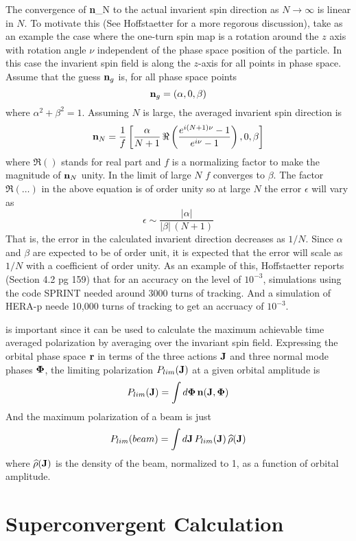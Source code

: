 \documentclass[11pt,openany]{report}
\newcommand{\Bf}[1]{{\bf #1}}
\newcommand{\bfn}{{\Bf n}}
\newcommand{\bfr}{{\Bf r}}
\newcommand{\bfJ}{{\Bf J}}
\newcommand{\bfPhi}{{\Bf \Phi}}
\newcommand{\Plim}{P_{lim}}
\newcommand{\Begineq}{\begin{equation}}
\newcommand{\Endeq}{\end{equation}}
\begin{document}
The convergence of \bfn_N to the actual invarient spin direction as $N \rightarrow \infty$ is linear
in $N$. To motivate this (See Hoffstaetter for a more regorous discussion), take as an example the
case where the one-turn spin map is a rotation around the $z$ axis with rotation angle $\nu$
independent of the phase space position of the particle. In this case the invarient spin field is
along the $z$-axis for all points in phase space. Assume that the guess $\bfn_g$ is, for all phase
space points
\Begineq
  \bfn_g = (\alpha, 0, \beta)
\Endeq
where $\alpha^2 + \beta^2 = 1$. Assuming $N$ is large, the averaged invarient spin direction is
\Begineq
  \bfn_N = \frac{1}{f} \left[ \frac{\alpha}{N+1} \, 
    \Re \left( \frac{e^{i (N+1) \nu} - 1}{e^{i \nu} - 1} \right),
    0, \beta \right]
\Endeq
where $\Re()$ stands for real part and $f$ is a normalizing factor to make the magnitude of $\bfn_N$
unity. In the limit of large $N$ $f$ converges to $\beta$. The factor $\Re(\ldots)$ in the above
equation is of order unity so at large $N$ the error $\epsilon$ will vary as
\Begineq
  \epsilon \sim \frac{|\alpha|}{|\beta| \, (N+1)}
\Endeq
That is, the error in the calculated invarient direction decreases as $1/N$. Since $\alpha$ and
$\beta$ are expected to be of order unit, it is expected that the error will scale as $1/N$ with a
coefficient of order unity. As an example of this, Hoffstaetter reports (Section 4.2 pg 159) that
for an accuracy on the level of $10^{-3}$, simulations using the code SPRINT needed around 3000
turns of tracking. And a simulation of HERA-p neede 10,000 turns of tracking to get an accruacy of
$10^{-3}$.


is important since it can be used to
calculate the maximum achievable time averaged polarization by averaging over the invariant spin
field. Expressing the orbital phase space $\bfr$ in terms of the three actions $\bfJ$ and three normal
mode phases $\bfPhi$, the limiting polarization $\Plim(\bfJ)$ at a given orbital amplitude is
\Begineq
  \Plim(\bfJ) = \int d\bfPhi \, \bfn(\bfJ, \bfPhi)
\Endeq
And the maximum polarization of a beam is just
\Begineq
   \Plim(beam) = \int d\bfJ \, \Plim(\bfJ) \, \widehat\rho(\bfJ) 
\Endeq
where $\widehat\rho(\bfJ)$ is the density of the beam, normalized to 1, as a function of orbital
amplitude.

\section{Superconvergent Calculation}
\end{document}
